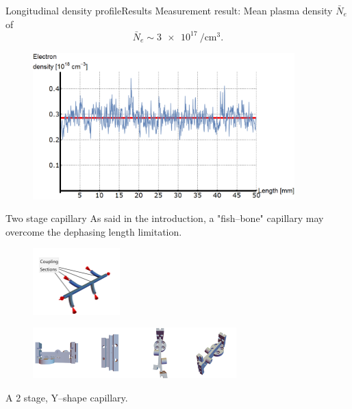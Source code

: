 \documentclass[]{beamer}
\begin{document}
  \begin{frame}{Longitudinal density profile}{Results}
    Measurement result: Mean plasma density $\bar{N}_e$ of
    \begin{equation*}
        \bar{N}_e \sim \SI{3e17}{\per\cubic\cm}.
    \end{equation*}
    \begin{figure}
      \includegraphics[width=0.9\textwidth]{figures/results/spectro/longitudinal_profile.png}
    \end{figure}
  \end{frame}
  \begin{frame}{Two stage capillary}
    As said in the introduction, a "fish--bone" capillary may overcome the dephasing length limitation.
     \begin{figure}
     \includegraphics[width=0.3\textwidth]{figures/coupling_scheme.pdf}
     \end{figure}
     \begin{figure}
     \includegraphics[width=0.7\textwidth]{figures/results/2stageCapillary/doublecapillary_cad.png}
     \end{figure}
     A 2 stage, Y--shape capillary.
  \end{frame}
\end{document}
